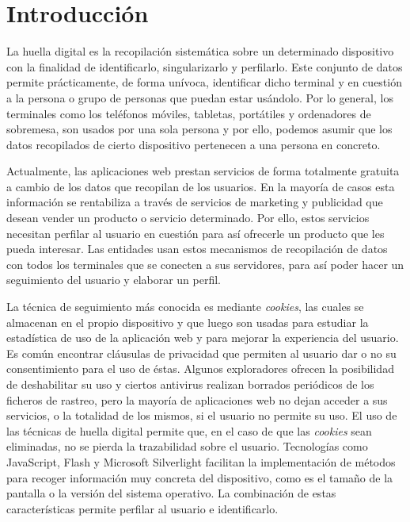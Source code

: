 \chapter{Introducción}

La huella digital es la recopilación sistemática sobre un determinado dispositivo con la finalidad de identificarlo, singularizarlo y perfilarlo. Este conjunto de datos permite prácticamente, de forma unívoca, identificar dicho terminal y en cuestión a la persona o grupo de personas que puedan estar usándolo. Por lo general, los terminales como los teléfonos móviles, tabletas, portátiles y ordenadores de sobremesa, son usados por una sola persona y por ello, podemos asumir que los datos recopilados de cierto dispositivo pertenecen a una persona en concreto\cite{Huella}.\par

Actualmente, las aplicaciones web prestan servicios de forma totalmente gratuita a cambio de los datos que recopilan de los usuarios. En la mayoría de casos esta información se rentabiliza a través de servicios de marketing y publicidad que desean vender un producto o servicio determinado. Por ello, estos servicios necesitan perfilar al usuario en cuestión para así ofrecerle un producto que les pueda interesar. Las entidades usan estos mecanismos de recopilación de datos con todos los terminales que se conecten a sus servidores, para así poder hacer un seguimiento del usuario y elaborar un perfil.\par

La técnica de seguimiento más conocida es mediante \textit{cookies}, las cuales se almacenan en el propio dispositivo y que luego son usadas para estudiar la estadística de uso de la aplicación web y para mejorar la experiencia del usuario. Es común encontrar cláusulas de privacidad que permiten al usuario dar o no su consentimiento para el uso de éstas. Algunos exploradores ofrecen la posibilidad de deshabilitar su uso y ciertos antivirus realizan borrados periódicos de los ficheros de rastreo, pero la mayoría de aplicaciones web no dejan acceder a sus servicios, o la totalidad de los mismos, si el usuario no permite su uso. El uso de las técnicas de huella digital permite que, en el caso de que las \textit{cookies} sean eliminadas, no se pierda la trazabilidad sobre el usuario. Tecnologías como JavaScript, Flash y Microsoft Silverlight facilitan la implementación de métodos para recoger información muy concreta del dispositivo, como es el tamaño de la pantalla o la versión del sistema operativo. La combinación de estas características permite perfilar al usuario e identificarlo.  \par

